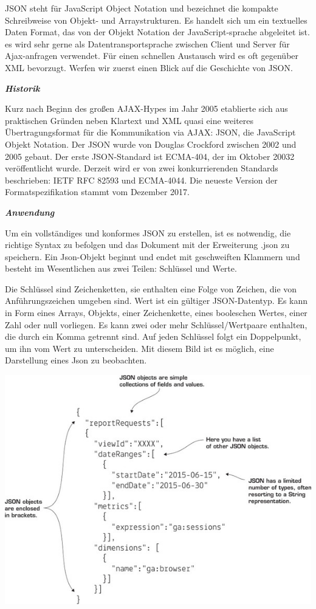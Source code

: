 JSON steht für JavaScript Object Notation und bezeichnet die kompakte Schreibweise von Objekt- und Arraystrukturen.\cite{philipp524} Es handelt sich um ein textuelles Daten Format, das von der Objekt Notation der JavaScript-sprache abgeleitet ist. es wird sehr gerne als Datentransportsprache zwischen Client und Server für Ajax-anfragen verwendet. Für einen schnellen Austausch wird es oft gegenüber XML bevorzugt. Werfen wir zuerst einen Blick auf die Geschichte von JSON. 

\textit{\textbf{Historik}}

Kurz nach Beginn des großen AJAX-Hypes im Jahr 2005 etablierte sich aus praktischen Gründen neben Klartext und XML quasi eine weiteres Übertragungsformat für die Kommunikation via AJAX: JSON, die JavaScript Objekt Notation.\cite{philipp658}
Der JSON wurde von Douglas Crockford zwischen 2002 und 2005 gebaut. Der erste JSON-Standard ist ECMA-404, der im Oktober 20032 veröffentlicht wurde. Derzeit wird er von zwei konkurrierenden Standards beschrieben: IETF RFC 82593 und ECMA-4044. Die neueste Version der Formatspezifikation stammt vom Dezember 2017. \cite{wikip01}

\textit{\textbf{Anwendung}}

Um ein vollständiges und konformes JSON zu erstellen, ist es notwendig, die richtige Syntax zu befolgen und das Dokument mit der Erweiterung .json zu speichern. Ein Json-Objekt beginnt und endet mit geschweiften Klammern {} und besteht im Wesentlichen aus zwei Teilen: Schlüssel und Werte. 

Die Schlüssel sind Zeichenketten, sie enthalten eine Folge von Zeichen, die von Anführungszeichen umgeben sind. Wert ist ein gültiger JSON-Datentyp. Es kann in Form eines Arrays, Objekts, einer Zeichenkette, eines booleschen Wertes, einer Zahl oder null vorliegen. Es kann zwei oder mehr Schlüssel/Wertpaare enthalten, die durch ein Komma getrennt sind. Auf jeden Schlüssel folgt ein Doppelpunkt, um ihn vom Wert zu unterscheiden. Mit diesem Bild ist es möglich, eine Darstellung eines Json zu beobachten. 

\begin{center}
\includegraphics[width=.7\textwidth]{images/8.Darstellung_eines_JSON-Objekts}
\end{center}


